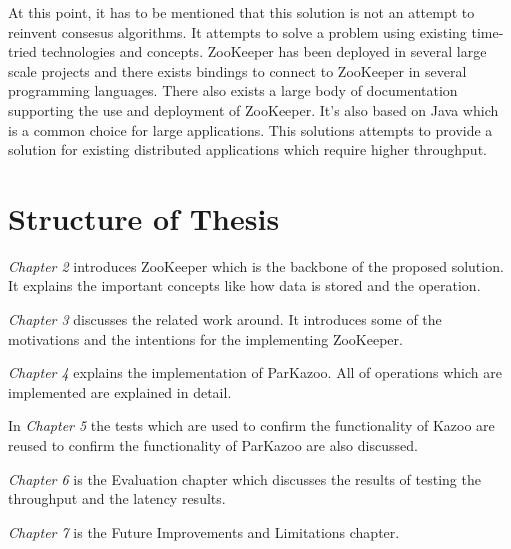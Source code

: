 At this point, it has to be mentioned that this solution is not an attempt to reinvent consesus algorithms. It attempts to solve a problem using existing time-tried technologies and concepts. ZooKeeper has been deployed in several large scale projects and there exists bindings to connect to ZooKeeper in several programming languages. There also exists a large body of documentation supporting the use and deployment of ZooKeeper. It's also based on Java which is a common choice for large applications. This solutions attempts to provide a solution for existing distributed applications which require higher throughput.

\section{Structure of Thesis}

\textit{Chapter 2} introduces ZooKeeper which is the backbone of the proposed solution. It explains the important concepts like how data is stored and the operation.

\textit{Chapter 3} discusses the related work around. It introduces some of the motivations and the intentions for the implementing ZooKeeper.

\textit{Chapter 4} explains the implementation of ParKazoo. All of operations which are implemented are explained in detail.

In \textit{Chapter 5} the tests which are used to confirm the functionality of Kazoo are reused to confirm the functionality of ParKazoo are also discussed.

\textit{Chapter 6} is the Evaluation chapter which discusses the results of testing the throughput and the latency results.

\textit{Chapter 7} is the Future Improvements and Limitations chapter.
